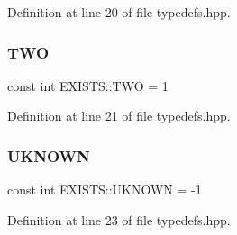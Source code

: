Definition at line 20 of file typedefs.\+hpp.

\mbox{\label{namespace_e_x_i_s_t_s_ad76d02e8eb6d20715d333b72394b0648}} 
\subsubsection{\texorpdfstring{T\+WO}{TWO}}
{\footnotesize\ttfamily const int E\+X\+I\+S\+T\+S\+::\+T\+WO = 1}



Definition at line 21 of file typedefs.\+hpp.

\mbox{\label{namespace_e_x_i_s_t_s_a81eb362d951445c658942a433afddb97}} 
\subsubsection{\texorpdfstring{U\+K\+N\+O\+WN}{UKNOWN}}
{\footnotesize\ttfamily const int E\+X\+I\+S\+T\+S\+::\+U\+K\+N\+O\+WN = -\/1}



Definition at line 23 of file typedefs.\+hpp.

